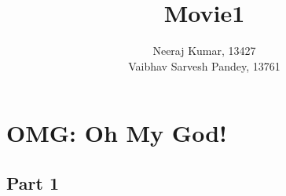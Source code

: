 \documentclass[a4paper]{article}
\title{Movie1 }
\author{Neeraj Kumar, 13427\\
	Vaibhav Sarvesh Pandey, 13761}
\begin{document}
	\maketitle
	
	
	
	\section{OMG: Oh My God! }
	
	    \subsection{Part 1}
	    	        
	        
	            
	        
	        
	        
	    
	    
	

	
	
\end{document}
